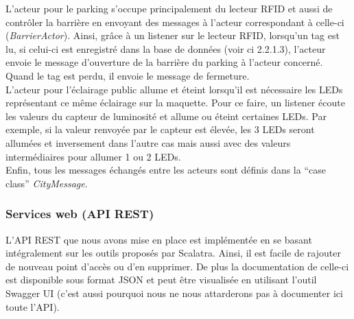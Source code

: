 L’acteur pour le parking s’occupe principalement du lecteur RFID et aussi de contrôler la barrière en envoyant des messages à l’acteur correspondant à celle-ci (\emph{BarrierActor}). Ainsi, grâce à un listener sur le lecteur RFID, lorsqu’un tag est lu, si celui-ci est enregistré dans la base de données (voir ci 2.2.1.3), l’acteur envoie le message d’ouverture de la barrière du parking à l’acteur concerné. Quand le tag est perdu, il envoie le message de fermeture.\\

L’acteur pour l’éclairage public allume et éteint lorsqu’il est nécessaire les LEDs représentant ce même éclairage sur la maquette. Pour ce faire, un listener écoute les valeurs du capteur de luminosité et allume ou éteint certaines LEDs. Par exemple, si la valeur renvoyée par le capteur est élevée, les 3 LEDs seront allumées et inversement dans l’autre cas mais aussi avec des valeurs intermédiaires pour allumer 1 ou 2 LEDs.\\

Enfin, tous les messages échangés entre les acteurs sont définis dans la “case class” \emph{CityMessage}.


\subsubsection{Services web (API REST)}
L’API REST que nous avons mise en place est implémentée en se basant intégralement sur les outils proposés par Scalatra. Ainsi, il est facile de rajouter de nouveau point d’accès ou d’en supprimer. De plus la documentation de celle-ci est disponible sous format JSON et peut être visualisée en utilisant l’outil Swagger UI (c’est aussi pourquoi nous ne nous attarderons pas à documenter ici toute l’API).\\

